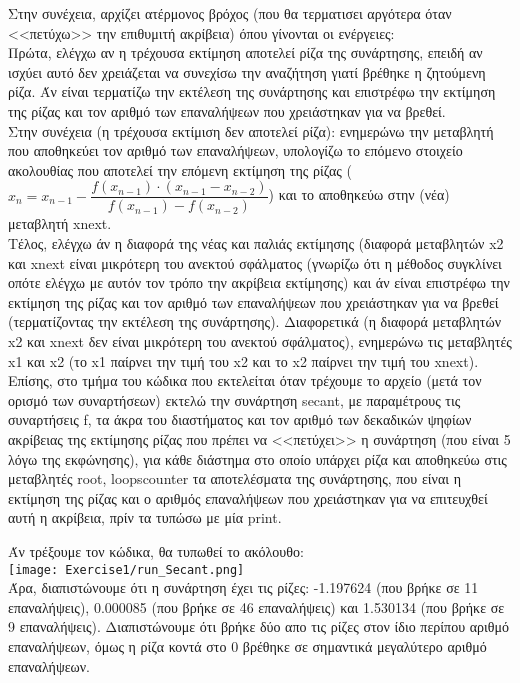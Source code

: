 \documentclass[a4paper,11pt]{article}
\newcommand{\lt}{\latintext}
\begin{document}
Στην συνέχεια, αρχίζει ατέρμονος βρόχος (που θα τερματισει αργότερα όταν <<πετύχω>> την επιθυμιτή ακρίβεια) όπου γίνονται οι ενέργειες:\\
Πρώτα, ελέγχω αν η τρέχουσα εκτίμηση αποτελεί ρίζα της συνάρτησης, επειδή αν ισχύει αυτό δεν χρειάζεται να συνεχίσω την αναζήτηση γιατί βρέθηκε η ζητούμενη ρίζα. Άν είναι τερματίζω την εκτέλεση της συνάρτησης και επιστρέφω την εκτίμηση της ρίζας και τον αριθμό των επαναλήψεων που χρειάστηκαν για να βρεθεί.\\
Στην συνέχεια (η τρέχουσα εκτίμιση δεν αποτελεί ρίζα): ενημερώνω την μεταβλητή που αποθηκεύει τον αριθμό των επαναλήψεων, υπολογίζω το επόμενο στοιχείο ακολουθίας που αποτελεί την επόμενη εκτίμηση της ρίζας ($x_n = x_{n-1} - \dfrac{f(x_{n-1}) \cdot (x_{n-1} - x_{n-2})}{f(x_{n-1}) - f(x_{n-2})}$) και το αποθηκεύω στην (νέα) μεταβλητή {\lt x\textunderscore next}.\\
Τέλος, ελέγχω άν η διαφορά της νέας και παλιάς εκτίμησης (διαφορά μεταβλητών {\lt x2} και {\lt x\textunderscore next} είναι μικρότερη του ανεκτού σφάλματος (γνωρίζω ότι η μέθοδος συγκλίνει οπότε ελέγχω με αυτόν τον τρόπο την ακρίβεια εκτίμησης) και άν είναι επιστρέφω την εκτίμηση της ρίζας και τον αριθμό των επαναλήψεων που χρειάστηκαν για να βρεθεί (τερματίζοντας την εκτέλεση της συνάρτησης). 
Διαφορετικά (η διαφορά μεταβλητών {\lt x2} και {\lt x\textunderscore next} δεν είναι μικρότερη του ανεκτού σφάλματος), ενημερώνω τις μεταβλητές {\lt x1} και {\lt x2} (το {\lt x1} παίρνει την τιμή του {\lt x2} και το {\lt x2} παίρνει την τιμή του {\lt x\textunderscore next}).\\
Επίσης, στο τμήμα του κώδικα που εκτελείται όταν τρέχουμε το αρχείο (μετά τον ορισμό των συναρτήσεων) εκτελώ την συνάρτηση {\lt secant}, με παραμέτρους τις συναρτήσεις {\lt f}, τα άκρα του διαστήματος και τον αριθμό των δεκαδικών ψηφίων ακρίβειας της εκτίμησης ρίζας που πρέπει να <<πετύχει>> η συνάρτηση (που είναι 5 λόγω της εκφώνησης), για κάθε διάστημα στο οποίο υπάρχει ρίζα και αποθηκεύω στις μεταβλητές {\lt root, loops\textunderscore counter} τα αποτελέσματα της συνάρτησης, που είναι η εκτίμηση της ρίζας και ο αριθμός επαναλήψεων που χρειάστηκαν για να επιτευχθεί αυτή η ακρίβεια, πρίν τα τυπώσω με μία {\lt print}.

Άν τρέξουμε τον κώδικα, θα τυπωθεί το ακόλουθο:\\

\texttt{[image: Exercise1/run\_Secant.png]}\\

Άρα, διαπιστώνουμε ότι η συνάρτηση έχει τις ρίζες: -1.197624 (που βρήκε σε 11 επαναλήψεις), 0.000085 (που βρήκε σε 46 επαναλήψεις) και 1.530134 (που βρήκε σε 9 επαναλήψεις). Διαπιστώνουμε ότι βρήκε δύο απο τις ρίζες στον ίδιο περίπου αριθμό επαναλήψεων, όμως η ρίζα κοντά στο 0 βρέθηκε σε σημαντικά μεγαλύτερο αριθμό επαναλήψεων.
\end{document}
